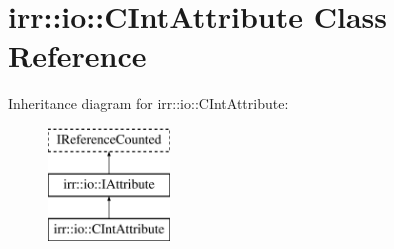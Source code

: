 \hypertarget{classirr_1_1io_1_1_c_int_attribute}{\section{irr\-:\-:io\-:\-:C\-Int\-Attribute Class Reference}
\label{classirr_1_1io_1_1_c_int_attribute}
}
Inheritance diagram for irr\-:\-:io\-:\-:C\-Int\-Attribute\-:\begin{figure}[H]
\begin{center}
\leavevmode
\includegraphics[height=3.000000cm]{classirr_1_1io_1_1_c_int_attribute}
\end{center}
\end{figure}
